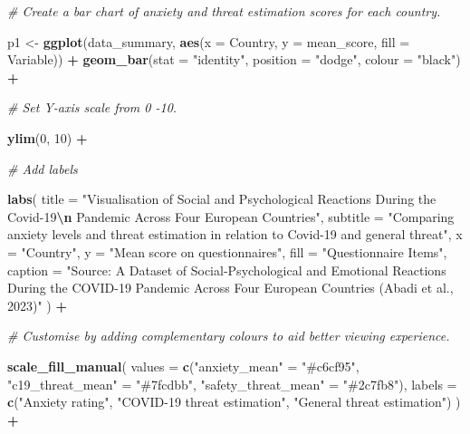 \documentclass[
]{article}
\newenvironment{Shaded}{\begin{snugshade}}{\end{snugshade}}
\newcommand{\AttributeTok}[1]{\textcolor[rgb]{0.13,0.29,0.53}{#1}}
\newcommand{\CommentTok}[1]{\textcolor[rgb]{0.56,0.35,0.01}{\textit{#1}}}
\newcommand{\DecValTok}[1]{\textcolor[rgb]{0.00,0.00,0.81}{#1}}
\newcommand{\FunctionTok}[1]{\textcolor[rgb]{0.13,0.29,0.53}{\textbf{#1}}}
\newcommand{\NormalTok}[1]{#1}
\newcommand{\OtherTok}[1]{\textcolor[rgb]{0.56,0.35,0.01}{#1}}
\newcommand{\SpecialCharTok}[1]{\textcolor[rgb]{0.81,0.36,0.00}{\textbf{#1}}}
\newcommand{\StringTok}[1]{\textcolor[rgb]{0.31,0.60,0.02}{#1}}
\begin{document}
\begin{Shaded}
\begin{Highlighting}[]
\CommentTok{\# Create a bar chart of anxiety and threat estimation scores for each country.}

\NormalTok{p1 }\OtherTok{\textless{}{-}} \FunctionTok{ggplot}\NormalTok{(data\_summary, }\FunctionTok{aes}\NormalTok{(}\AttributeTok{x =}\NormalTok{ Country, }\AttributeTok{y =}\NormalTok{ mean\_score, }\AttributeTok{fill =}\NormalTok{ Variable)) }\SpecialCharTok{+}
  \FunctionTok{geom\_bar}\NormalTok{(}\AttributeTok{stat =} \StringTok{"identity"}\NormalTok{, }\AttributeTok{position =} \StringTok{"dodge"}\NormalTok{, }\AttributeTok{colour =} \StringTok{"black"}\NormalTok{) }\SpecialCharTok{+}
  
  \CommentTok{\# Set Y{-}axis scale from 0 {-}10. }
  
  \FunctionTok{ylim}\NormalTok{(}\DecValTok{0}\NormalTok{, }\DecValTok{10}\NormalTok{) }\SpecialCharTok{+}
  
  \CommentTok{\# Add labels}
  
  \FunctionTok{labs}\NormalTok{(}
    \AttributeTok{title =} \StringTok{"Visualisation of Social and Psychological Reactions During the Covid{-}19}\SpecialCharTok{\textbackslash{}n}\StringTok{ Pandemic Across Four European Countries"}\NormalTok{,}
    \AttributeTok{subtitle =} \StringTok{"Comparing anxiety levels and threat estimation in relation to Covid{-}19 and general threat"}\NormalTok{,}
    \AttributeTok{x =} \StringTok{"Country"}\NormalTok{,}
    \AttributeTok{y =} \StringTok{"Mean score on questionnaires"}\NormalTok{,}
    \AttributeTok{fill =} \StringTok{"Questionnaire Items"}\NormalTok{,}
    \AttributeTok{caption =} \StringTok{"Source: A Dataset of Social{-}Psychological and Emotional Reactions During the COVID{-}19 Pandemic Across Four European Countries (Abadi et al., 2023)"}
\NormalTok{  ) }\SpecialCharTok{+}
  
  \CommentTok{\# Customise by adding complementary colours to aid better viewing experience. }
  
  \FunctionTok{scale\_fill\_manual}\NormalTok{(}
    \AttributeTok{values =} \FunctionTok{c}\NormalTok{(}\StringTok{"anxiety\_mean"} \OtherTok{=} \StringTok{"\#c6cf95"}\NormalTok{, }\StringTok{"c19\_threat\_mean"} \OtherTok{=} \StringTok{"\#7fcdbb"}\NormalTok{, }\StringTok{"safety\_threat\_mean"} \OtherTok{=} \StringTok{"\#2c7fb8"}\NormalTok{),}
    \AttributeTok{labels =} \FunctionTok{c}\NormalTok{(}\StringTok{"Anxiety rating"}\NormalTok{, }\StringTok{"COVID{-}19 threat estimation"}\NormalTok{, }\StringTok{"General threat estimation"}\NormalTok{)}
\NormalTok{  ) }\SpecialCharTok{+}
  

\end{Highlighting}
\end{Shaded}
\end{document}
